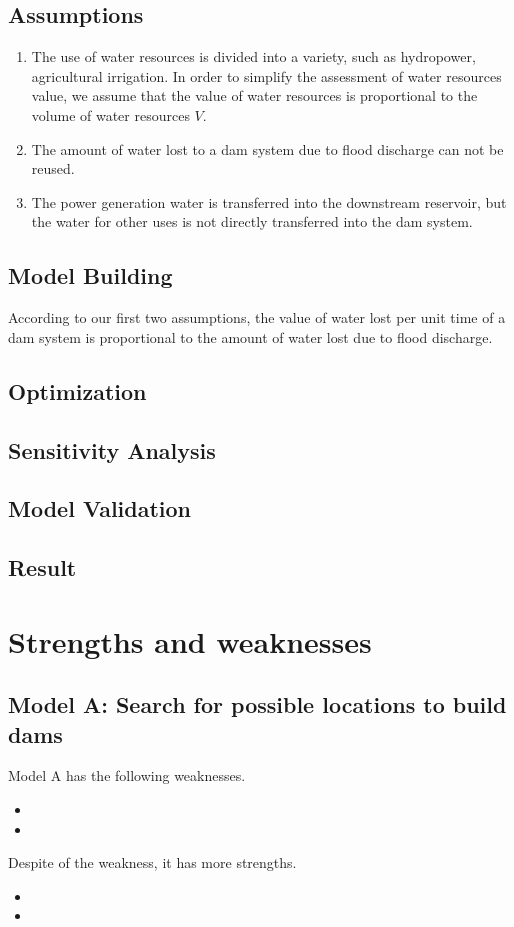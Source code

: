 \documentclass{mcmthesis}
\begin{document}
\subsection{Assumptions}
\begin{enumerate}
  \item The use of water resources is divided into a variety, such as hydropower, agricultural irrigation. In order to simplify the assessment of water resources value, we assume that the value of water resources is proportional to the volume of water resources $V$. 
  \item The amount of water lost to a dam system due to flood discharge can not be reused.
  \item The power generation water is transferred into the downstream reservoir, but the water for other uses is not directly transferred into the dam system.
\end{enumerate}

\subsection{Model Building}
According to our first two assumptions, the value of water lost per unit time of a dam system is proportional to the amount of water lost due to flood discharge. 
\subsection{Optimization}

\subsection{Sensitivity Analysis}

\subsection{Model Validation}

\subsection{Result}

\section{Strengths and weaknesses}
\subsection{Model A: Search for possible locations to build dams}
Model A has the following weaknesses.
\begin{itemize}
\item 
\item 
\end{itemize}
Despite of the weakness, it has more strengths.
\begin{itemize}
  \item 
  \item 
\end{itemize}
\end{document}
